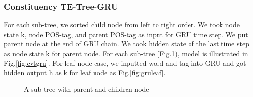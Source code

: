 \subsubsection{Constituency TE-Tree-GRU} \label{sec:VTtreeConstituency}
For each sub-tree, we sorted child node from left to right order. We took node state k, node POS-tag, and parent POS-tag as input for GRU time step. We put parent node at the end of GRU chain. We took hidden state of the last time step as node state k for parent node. For each sub-tree (Fig.\ref{fig:treecp}), model is illustrated in Fig.\ref{fig:cvtgru}. For leaf node case, we inputted word and tag into GRU and got hidden output h as k for leaf node as Fig.\ref{fig:gruleaf}.
\begin{figure}[H]
    \centering
    \caption[A sub tree with parent and children node]{A sub tree with parent and children node}
    \label{fig:treecp}
\end{figure}

